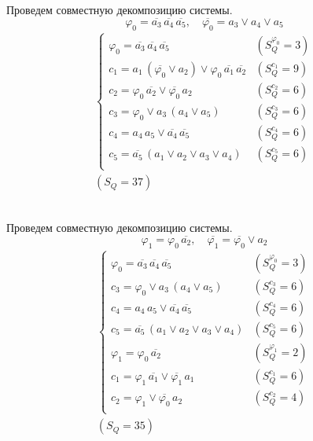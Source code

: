 \documentclass{article}
\begin{document}
\noindent\begin{minipage}{\textwidth}
Проведем совместную декомпозицию системы. \[\varphi_{0} = \overline{a_3}\,\overline{a_4}\,\overline{a_5}, \quad \overline{\varphi_{0}} = a_3 \lor a_4 \lor a_5\]
\[\begin{matrix}
    \begin{cases}
        \varphi_{0} = \overline{a_3}\,\overline{a_4}\,\overline{a_5} & (S_Q^{\varphi_{0}} = 3) \\
        c_1 = a_1\,\left(\overline{\varphi_{0}} \lor a_2\right) \lor \varphi_{0}\,\overline{a_1}\,\overline{a_2} & (S_Q^{c_1} = 9) \\
        c_2 = \varphi_{0}\,\overline{a_2} \lor \overline{\varphi_{0}}\,a_2 & (S_Q^{c_2} = 6) \\
        c_3 = \varphi_{0} \lor a_3\,\left(a_4 \lor a_5\right) & (S_Q^{c_3} = 6) \\
        c_4 = a_4\,a_5 \lor \overline{a_4}\,\overline{a_5} & (S_Q^{c_4} = 6) \\
        c_5 = \overline{a_5}\,\left(a_1 \lor a_2 \lor a_3 \lor a_4\right) & (S_Q^{c_5} = 6) \\
    \end{cases} \\ (S_Q = 37)
\end{matrix}\] \\ \phantom{0}
\end{minipage}
\noindent\begin{minipage}{\textwidth}
Проведем совместную декомпозицию системы. \[\varphi_{1} = \varphi_{0}\,\overline{a_2}, \quad \overline{\varphi_{1}} = \overline{\varphi_{0}} \lor a_2\]
\[\begin{matrix}
    \begin{cases}
        \varphi_{0} = \overline{a_3}\,\overline{a_4}\,\overline{a_5} & (S_Q^{\varphi_{0}} = 3) \\
        c_3 = \varphi_{0} \lor a_3\,\left(a_4 \lor a_5\right) & (S_Q^{c_3} = 6) \\
        c_4 = a_4\,a_5 \lor \overline{a_4}\,\overline{a_5} & (S_Q^{c_4} = 6) \\
        c_5 = \overline{a_5}\,\left(a_1 \lor a_2 \lor a_3 \lor a_4\right) & (S_Q^{c_5} = 6) \\
        \varphi_{1} = \varphi_{0}\,\overline{a_2} & (S_Q^{\varphi_{1}} = 2) \\
        c_1 = \varphi_{1}\,\overline{a_1} \lor \overline{\varphi_{1}}\,a_1 & (S_Q^{c_1} = 6) \\
        c_2 = \varphi_{1} \lor \overline{\varphi_{0}}\,a_2 & (S_Q^{c_2} = 4) \\
    \end{cases} \\ (S_Q = 35)
\end{matrix}\] \\ \phantom{0}
\end{minipage}
\end{document}
